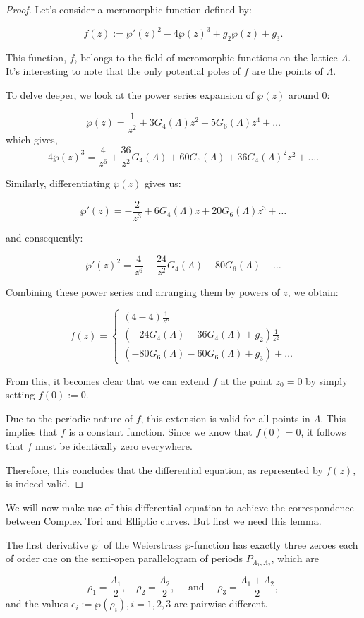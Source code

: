 \begin{proof}
Let's consider a meromorphic function defined by:

\[
f(z) := \wp'(z)^2 - 4\wp(z)^3 + g_2\wp(z) + g_3.
\]

This function, \( f \), belongs to the field of meromorphic functions on the lattice \( \Lambda \). It's interesting to note that the only potential poles of \( f \) are the points of \( \Lambda \).

To delve deeper, we look at the power series expansion of \( \wp(z) \) around 0:

\[
\wp(z) = \frac{1}{z^2} + 3G_4(\Lambda)z^2 + 5G_6(\Lambda)z^4 + \ldots
\]
which gives,
\[
4\wp(z)^3 = \frac{4}{z^6} + \frac{36}{z^2}G_4(\Lambda) + 60G_6(\Lambda) + 36G_4(\Lambda)^2z^2 + \ldots.
\]

Similarly, differentiating \( \wp(z) \) gives us:

\[
\wp'(z) = -\frac{2}{z^3} + 6G_4(\Lambda)z + 20G_6(\Lambda)z^3 + \ldots
\]

and consequently:

\[
\wp'(z)^2 = \frac{4}{z^6} - \frac{24}{z^2}G_4(\Lambda) - 80G_6(\Lambda) + \ldots
\]

Combining these power series and arranging them by powers of \( z \), we obtain:

\[
f(z) = \begin{cases}
(4-4) \frac{1}{z^6} \\
\left(-24G_4(\Lambda) - 36G_4(\Lambda) + g_2\right) \frac{1}{z^2} \\
\left(-80G_6(\Lambda) - 60G_6(\Lambda) + g_3\right) + \ldots
\end{cases}
\]

From this, it becomes clear that we can extend \( f \) at the point \( z_0 = 0 \) by simply setting \( f(0) := 0 \).

Due to the periodic nature of \( f \), this extension is valid for all points in \( \Lambda \). This implies that \( f \) is a constant function. Since we know that \( f(0) = 0 \), it follows that \( f \) must be identically zero everywhere.

Therefore, this concludes that the differential equation, as represented by \( f(z) \), is indeed valid. 
\end{proof}

We will now make use of this differential equation to achieve the correspondence between Complex Tori and Elliptic curves. But first we need this lemma. 

\begin{lemma}
The first derivative $\wp^{\prime}$ of the Weierstrass $\wp$-function has exactly three zeroes each of order one on the semi-open parallelogram of periods $P_{\Lambda_{1}, \Lambda_{2}}$, which are

$$
\rho_{1}=\frac{\Lambda_{1}}{2}, \quad \rho_{2}=\frac{\Lambda_{2}}{2}, \quad \text { and } \quad \rho_{3}=\frac{\Lambda_{1}+\Lambda_{2}}{2} 
, $$ and the values $e_{i}:=\wp\left(\rho_{i}\right), i=1,2,3$ are pairwise different.

\end{lemma}



